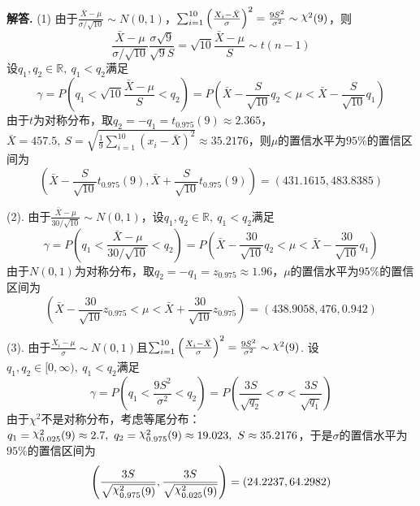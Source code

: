 \documentclass[12pt, a4paper, oneside]{ctexart}
\newenvironment{solution}[1][]{\par\noindent\textbf{#1解答. }}{\smallskip\par}  %
\DeclareRobustCommand{\rchi}{{\mathpalette\irchi\relax}}
\newcommand{\irchi}[2]{\raisebox{\depth}{$#1\chi$}} %
\def\R{\mathbb{R}}          %
\begin{document}
\begin{solution}
    (1) 由于$\frac{\bar{X}-\mu}{\sigma/\sqrt{10}}\sim N(0,1)$，$\sum_{i=1}^{10}\left(\frac{X_i-\bar{X}}{\sigma}\right)^2=\frac{9S^2}{\sigma^2}\sim\rchi^2(9)$，则
    \begin{equation*}
        \frac{\bar{X}-\mu}{\sigma/\sqrt{10}}\frac{\sigma\sqrt{9}}{\sqrt{9}S} = \sqrt{10}\frac{\bar{X}-\mu}{S}\sim t(n-1)
    \end{equation*}
    设$q_1,q_2\in\R,\ q_1<q_2$满足
    \begin{equation*}
        \gamma = P\left(q_1 < \sqrt{10}\frac{\bar{X}-\mu}{S}<q_2\right) = P\left(\bar{X}-\frac{S}{\sqrt{10}}q_2<\mu<\bar{X}-\frac{S}{\sqrt{10}}q_1\right)
    \end{equation*}
    由于$t$为对称分布，取$q_2=-q_1 = t_{0.975}(9)\approx 2.365$，$\bar{X} = 457.5,\ S = \sqrt{\frac{1}{9}\sum_{i=1}^{10}(x_i-\bar{X})^2} \approx 35.2176$，则$\mu$的置信水平为$95\%$的置信区间为
    \begin{equation*}
        \left(\bar{X}-\frac{S}{\sqrt{10}}t_{0.975}(9),\bar{X}+\frac{S}{\sqrt{10}}t_{0.975}(9)\right) = (431.1615, 483.8385)
    \end{equation*}

    (2). 由于$\frac{\bar{X}-\mu}{30/\sqrt{10}}\sim N(0,1)$，设$q_1,q_2\in\R,\ q_1<q_2$满足
    \begin{equation*}
        \gamma = P\left(q_1<\frac{\bar{X}-\mu}{30/\sqrt{10}}<q_2\right)  = P\left(\bar{X}-\frac{30}{\sqrt{10}}q_2<\mu<\bar{X}-\frac{30}{\sqrt{10}}q_1\right)
    \end{equation*}
    由于$N(0,1)$为对称分布，取$q_2=-q_1 = z_{0.975}\approx 1.96$，$\mu$的置信水平为$95\%$的置信区间为
    \begin{equation*}
        \left(\bar{X}-\frac{30}{\sqrt{10}}z_{0.975}<\mu<\bar{X}+\frac{30}{\sqrt{10}}z_{0.975}\right) = (438.9058, 476, 0.942)
    \end{equation*}

    (3). 由于$\frac{X_i-\mu}{\sigma}\sim  N(0,1)$且$\sum_{i=1}^{10}\left(\frac{X_i-\bar{X}}{\sigma}\right)^2 = \frac{9S^2}{\sigma^2} \sim \rchi^2(9)$. 设$q_1,q_2\in[0,\infty),\ q_1 < q_2$满足
    \begin{equation*}
        \gamma = P\left(q_1<\frac{9S^2}{\sigma^2}<q_2\right) = P\left(\frac{3S}{\sqrt{q_2}}<\sigma<\frac{3S}{\sqrt{q_1}}\right)
    \end{equation*}
    由于$\chi^2$不是对称分布，考虑等尾分布：$q_1=\rchi^2_{0.025}(9)\approx 2.7,\ q_2=\rchi^2_{0.975}(9)\approx 19.023,\ S \approx 35.2176$，于是$\sigma$的置信水平为$95\%$的置信区间为
    \begin{equation*}
        \left(\frac{3S}{\sqrt{\rchi^2_{0.975}(9)}},\frac{3S}{\sqrt{\rchi^2_{0.025}(9)}}\right) = (24.2237, 64.2982)
    \end{equation*}
\end{solution}
\end{document}
